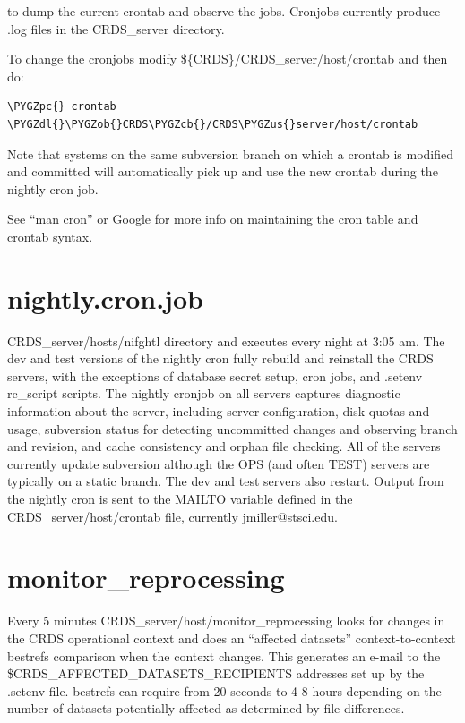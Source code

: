 \documentclass[letterpaper,10pt,english]{sphinxmanual}
\def\PYGZus{\char`\_}
\def\PYGZob{\char`\{}
\def\PYGZcb{\char`\}}
\def\PYGZpc{\char`\%}
\def\PYGZdl{\char`\$}
\begin{document}
to dump the current crontab and observe the jobs.   Cronjobs currently produce .log files in the CRDS\_server directory.

To change the cronjobs modify \$\{CRDS\}/CRDS\_server/host/crontab and then do:

\begin{Verbatim}[commandchars=\\\{\}]
\PYGZpc{} crontab \PYGZdl{}\PYGZob{}CRDS\PYGZcb{}/CRDS\PYGZus{}server/host/crontab
\end{Verbatim}

Note that systems on the same subversion branch on which a crontab is modified and committed will automatically pick
up and use the new crontab during the nightly cron job.

See ``man cron'' or Google for more info on maintaining the cron table and crontab syntax.


\section{nightly.cron.job}
\label{server_guide:nightly-cron-job}
CRDS\_server/hosts/nifghtl directory and executes every night at 3:05 am.  The dev and test versions
of the nightly cron fully rebuild and reinstall the CRDS servers,  with the exceptions of database secret setup,
cron jobs, and .setenv rc\_script scripts.   The nightly cronjob on all servers captures diagnostic information about
the server,  including server configuration, disk quotas and usage, subversion status for detecting uncommitted
changes and observing branch and revision, and cache consistency and orphan file checking.   All of the servers
currently update subversion although the OPS (and often TEST) servers are typically on a static branch.   The dev
and test servers also restart.  Output from the nightly cron is sent to the MAILTO variable defined in the
CRDS\_server/host/crontab file,  currently \href{mailto:jmiller@stsci.edu}{jmiller@stsci.edu}.


\section{monitor\_reprocessing}
\label{server_guide:monitor-reprocessing}
Every 5 minutes CRDS\_server/host/monitor\_reprocessing looks for changes in the CRDS operational context and
does an ``affected datasets'' context-to-context bestrefs comparison when the context changes.   This generates
an e-mail to the \$CRDS\_AFFECTED\_DATASETS\_RECIPIENTS addresses set up by the .setenv file.   bestrefs can require
from 20 seconds to 4-8 hours depending on the number of datasets potentially affected as determined by file
differences.
\end{document}
